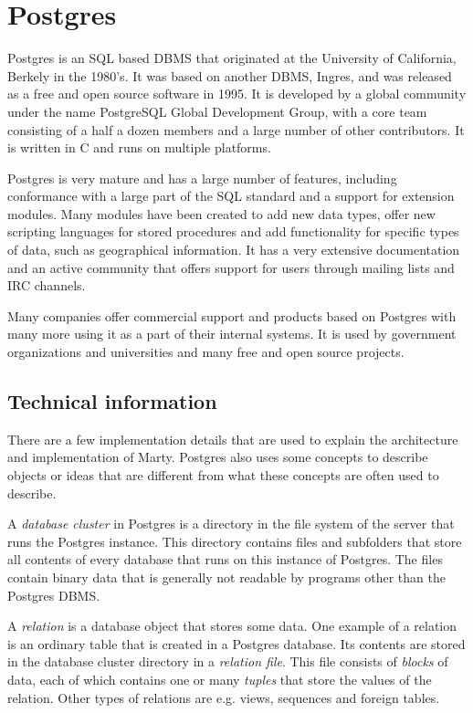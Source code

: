 \section{Postgres}
Postgres is an SQL based DBMS that originated at the University of California, Berkely in the 1980's.
It was based on another DBMS, Ingres, and was released as a free and open source software in 1995.
It is developed by a global community under the name PostgreSQL Global Development Group, with a core team consisting of a half a dozen members and a large number of other contributors.
It is written in C and runs on multiple platforms.

Postgres is very mature and has a large number of features, including conformance with a large part of the SQL standard and a support for extension modules.
Many modules have been created to add new data types, offer new scripting languages for stored procedures and add functionality for specific types of data, such as geographical information.
It has a very extensive documentation and an active community that offers support for users through mailing lists and IRC channels.

Many companies offer commercial support and products based on Postgres with many more using it as a part of their internal systems.
It is used by government organizations and universities and many free and open source projects.

\subsection{Technical information}
There are a few implementation details that are used to explain the architecture and implementation of Marty.
Postgres also uses some concepts to describe objects or ideas that are different from what these concepts are often used to describe.

A \textit{database cluster} in Postgres is a directory in the file system of the server that runs the Postgres instance.
This directory contains files and subfolders that store all contents of every database that runs on this instance of Postgres.
The files contain binary data that is generally not readable by programs other than the Postgres DBMS.

A \textit{relation} is a database object that stores some data.
One example of a relation is an ordinary table that is created in a Postgres database.
Its contents are stored in the database cluster directory in a \textit{relation file}.
This file consists of \textit{blocks} of data, each of which contains one or many \textit{tuples} that store the values of the relation.
Other types of relations are e.g. views, sequences and foreign tables.

